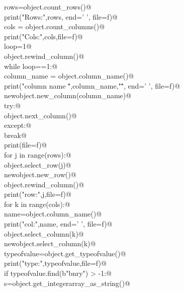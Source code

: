 \documentclass[10pt,a4paper,twoside,notitlepage]{article}
\begin{document}
\begin{flushleft}
\begin{minipage}{\linewidth}
\begin{list}{}{}
\mbox{}\verb@        rows=object.count_rows()@\\
\mbox{}\verb@        print("Rows:",rows, end=' ', file=f)@\\
\mbox{}\verb@        cols = object.count_columns()@\\
\mbox{}\verb@        print("Cols:",cols,file=f)@\\
\mbox{}\verb@        loop=1@\\
\mbox{}\verb@        object.rewind_column()@\\
\mbox{}\verb@        while loop==1:@\\
\mbox{}\verb@            column_name = object.column_name()@\\
\mbox{}\verb@            print("column name \"",column_name,"\"", end=' ', file=f)@\\
\mbox{}\verb@            newobject.new_column(column_name)@\\
\mbox{}\verb@            try:@\\
\mbox{}\verb@               object.next_column()@\\
\mbox{}\verb@            except:@\\
\mbox{}\verb@                break@\\
\mbox{}\verb@        print(file=f)@\\
\mbox{}\verb@        for j in range(rows):@\\
\mbox{}\verb@            object.select_row(j)@\\
\mbox{}\verb@            newobject.new_row()@\\
\mbox{}\verb@            object.rewind_column()@\\
\mbox{}\verb@            print("row:",j,file=f)@\\
\mbox{}\verb@            for k in range(cols):@\\
\mbox{}\verb@                name=object.column_name()@\\
\mbox{}\verb@                print("col:",name, end=' ', file=f)@\\
\mbox{}\verb@                object.select_column(k)@\\
\mbox{}\verb@                newobject.select_column(k)@\\
\mbox{}\verb@                typeofvalue=object.get_typeofvalue()@\\
\mbox{}\verb@                print("type:",typeofvalue,file=f)@\\
\mbox{}\verb@                if typeofvalue.find(b"bnry") > -1:@\\
\mbox{}\verb@                    s=object.get_integerarray_as_string()@\\

\end{list}
\end{minipage}
\end{flushleft}
\end{document}
